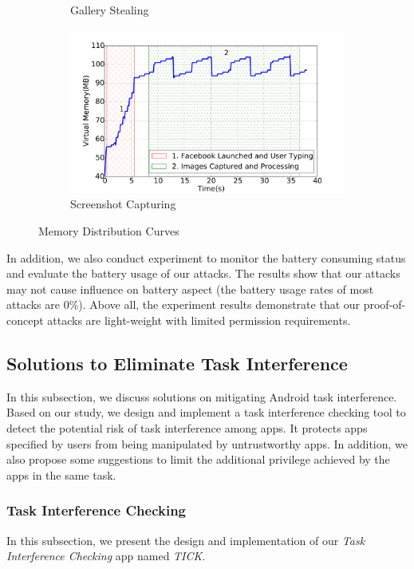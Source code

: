 \documentclass[letterpaper,12pt]{article}
\begin{document}
\begin{figure}[h]
\begin{subfigure}[t]{0.5\textwidth}
                \caption{Gallery Stealing}
        \end{subfigure}%
        \begin{subfigure}[t]{0.5\textwidth}
                \centering
          \includegraphics[width=\linewidth]{attack3memory.pdf}
                \caption{Screenshot Capturing}
        \end{subfigure}
         \caption{Memory Distribution Curves}
         \label{fig:memory}
\end{figure}

In addition, we also conduct experiment to monitor the battery consuming
status and evaluate the battery usage of our attacks. The results show
that our attacks may not cause influence on battery aspect (the
battery usage rates of most attacks are $0\%$).  Above all, the
experiment results demonstrate that our proof-of-concept attacks are
light-weight with limited permission requirements.

\subsection{Solutions to Eliminate Task Interference}\label{sec:atmsolution}
In this subsection, we discuss solutions on mitigating Android task
interference. Based on our study, we design and implement a task
interference checking tool to detect the potential risk of task
interference among apps. It protects apps specified by users from
being manipulated by untrustworthy apps. In addition, we also propose
some suggestions to limit the additional privilege achieved by the
apps in the same task.

\subsubsection{Task Interference Checking}
\label{sec:implementation}
In this subsection, we present the design and implementation of our
\textsl{Task Interference Checking} app named \textsl{TICK}.
\end{document}
